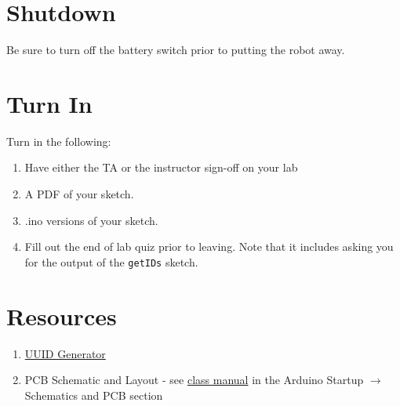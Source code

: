 \section{Shutdown}
Be sure to turn off the battery switch prior to putting the robot away.

\section{Turn In}
Turn in the following:
\begin{enumerate}
    \item Have either the TA or the instructor sign-off on your lab
    \item A PDF of your sketch.
    \item .ino versions of your sketch.
    \item Fill out the end of lab quiz prior to leaving. Note that it includes asking you 
            for the output of the \lstinline$getIDs$ sketch. 
\end{enumerate}

\section{Resources}%
\begin{enumerate}
    \item \href{https://www.uuidgenerator.net/}{UUID Generator} 
    \item PCB Schematic and Layout - see 
            \href{https://github.com/semcneil/Fundamentals-of-Microcontrollers-Manual}{class manual} 
            in the Arduino Startup $\rightarrow$ Schematics and PCB section
\end{enumerate}

